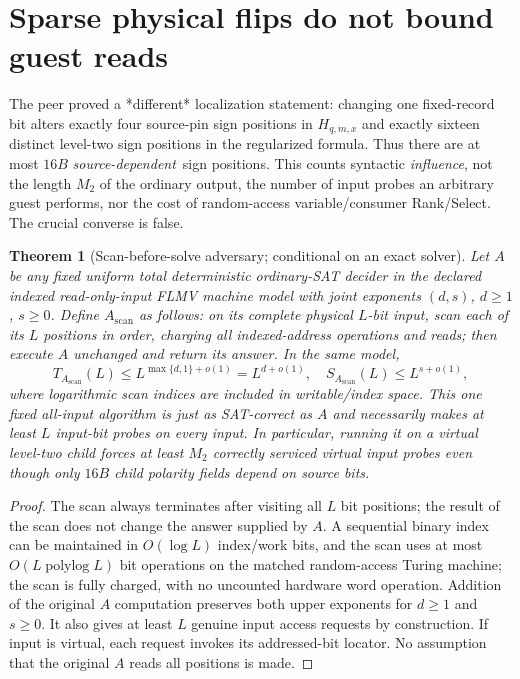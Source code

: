 \documentclass[11pt]{article}
\newtheorem{theorem}{Theorem}
\begin{document}
\section{Sparse physical flips do not bound guest reads}
The peer proved a *different* localization statement: changing one fixed-record bit alters exactly four source-pin sign positions in $H_{q,m,x}$ and exactly sixteen distinct level-two sign positions in the regularized formula. Thus there are at most $16B$ \emph{source-dependent}\ sign positions. This counts syntactic \emph{influence}, not the length $M_2$ of the ordinary output, the number of input probes an arbitrary guest performs, nor the cost of random-access variable/consumer Rank/Select. The crucial converse is false.

\begin{theorem}[Scan-before-solve adversary; conditional on an exact solver]
Let $A$ be any fixed uniform total deterministic ordinary-SAT decider in the declared indexed read-only-input FLMV machine model with joint exponents $(d,s)$, $d\ge1$, $s\ge0$. Define $A_{\mathrm{scan}}$ as follows: on its complete physical $L$-bit input, scan each of its $L$ positions in order, charging all indexed-address operations and reads; then execute $A$ unchanged and return its answer. In the same model,
\[
T_{A_{\mathrm{scan}}}(L)\le L^{\max\{d,1\}+o(1)}=L^{d+o(1)},\quad
S_{A_{\mathrm{scan}}}(L)\le L^{s+o(1)},\tag{7}
\]
where logarithmic scan indices are included in writable/index space. This \emph{one fixed} all-input algorithm is just as SAT-correct as $A$ and necessarily makes at least $L$ input-bit probes \emph{on every input}. In particular, running it on a virtual level-two child forces at least $M_2$ correctly serviced virtual input probes even though only $16B$ child polarity fields depend on source bits.
\end{theorem}
\begin{proof}
The scan always terminates after visiting all $L$ bit positions; the result of the scan does not change the answer supplied by $A$. A sequential binary index can be maintained in $O(\log L)$ index/work bits, and the scan uses at most $O(L\operatorname{polylog} L)$ bit operations on the matched random-access Turing machine; the scan is fully charged, with no uncounted hardware word operation. Addition of the original $A$ computation preserves both upper exponents for $d\ge1$ and $s\ge0$. It also gives at least $L$ genuine input access requests by construction. If input is virtual, each request invokes its addressed-bit locator. No assumption that the original $A$ reads all positions is made.
\end{proof}
\end{document}
